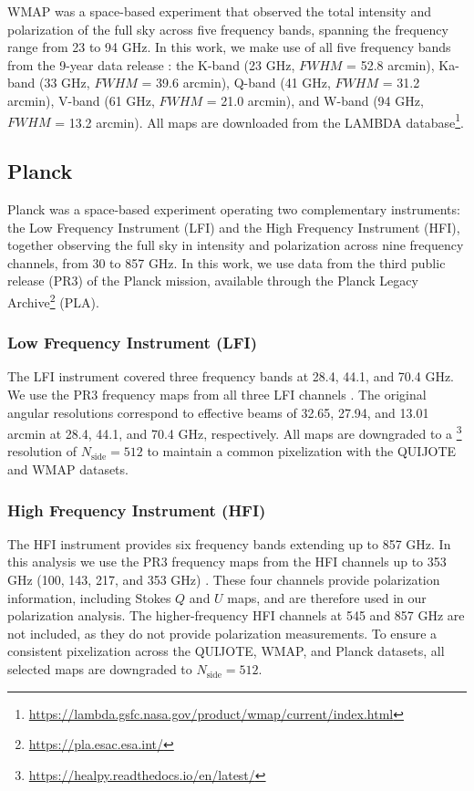 WMAP was a space-based experiment that observed the total intensity and polarization of the full sky across five frequency bands, spanning the frequency range from 23 to 94 GHz. In this work, we make use of all five frequency bands from the 9-year data release \citep{WMAP_maps}: the K-band (23 GHz, $FWHM$ = 52.8 arcmin), Ka-band (33 GHz, $FWHM$ = 39.6 arcmin), Q-band (41 GHz, $FWHM$ = 31.2 arcmin), V-band (61 GHz, $FWHM$ = 21.0 arcmin), and W-band (94 GHz, $FWHM$ = 13.2 arcmin). All maps are downloaded from the LAMBDA database\footnote{\url{https://lambda.gsfc.nasa.gov/product/wmap/current/index.html}}.

\subsection{Planck}
\label{sec:data_planck}

Planck was a space-based experiment operating two complementary instruments: the Low Frequency Instrument (LFI) and the High Frequency Instrument (HFI), together observing the full sky in intensity and polarization across nine frequency channels, from 30 to 857 GHz. In this work, we use data from the third public release (PR3) of the Planck mission, available through the Planck Legacy Archive\footnote{\url{https://pla.esac.esa.int/}} (PLA).

\subsubsection{Low Frequency Instrument (LFI)}

The LFI instrument covered three frequency bands at 28.4, 44.1, and 70.4 GHz. We use the PR3 frequency maps from all three LFI channels \citep{Planck_2015II}. The original angular resolutions correspond to effective beams of 32.65, 27.94, and 13.01 arcmin at 28.4, 44.1, and 70.4 GHz, respectively. All maps are downgraded to a \healpix\footnote{\url{https://healpy.readthedocs.io/en/latest/}} resolution of $N_\mathrm{side} = 512$ to maintain a common pixelization with the QUIJOTE and WMAP datasets.

\subsubsection{High Frequency Instrument (HFI)}

The HFI instrument provides six frequency bands extending up to 857 GHz. In this analysis we use the PR3 frequency maps from the HFI channels up to 353 GHz (100, 143, 217, and 353 GHz) \citep{Planck_2018III}. These four channels provide polarization information, including Stokes $Q$ and $U$ maps, and are therefore used in our polarization analysis. The higher-frequency HFI channels at 545 and 857 GHz are not included, as they do not provide polarization measurements. To ensure a consistent pixelization across the QUIJOTE, WMAP, and Planck datasets, all selected maps are downgraded to $N_\mathrm{side} = 512$.


